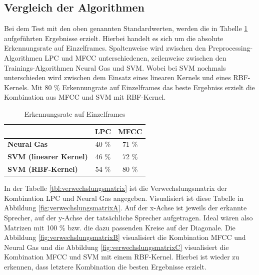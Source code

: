 \subsection{Vergleich der Algorithmen}
Bei dem Test mit den oben genannten Standardwerten, werden die in Tabelle \ref{tbl:vergleich} aufgeführten Ergebnisse erzielt. Hierbei handelt es sich um die absolute Erkennungsrate auf Einzelframes. Spaltenweise wird zwischen den Preprocessing-Algorithmen LPC und MFCC unterschiedenen, zeilenweise zwischen den Trainings-Algorithmen Neural Gas und SVM. Wobei bei SVM nochmals unterschieden wird zwischen dem Einsatz eines linearen Kernels und eines RBF-Kernels. Mit 80 \% Erkennungrate auf Einzelframes das beste Ergebniss erzielt die Kombination aus MFCC und SVM mit RBF-Kernel.

\begin{table}[h]
	\centering
	\begin{tabular}{l|c|c}			
		& \textbf{LPC} & \textbf{MFCC} \\
		\hline
		\textbf{Neural Gas} & 40 \% & 71 \% \\
		\textbf{SVM (linearer Kernel)} & 46 \% & 72 \% \\
		\textbf{SVM (RBF-Kernel)} & 54 \% & 80 \% \\
	\end{tabular}
	\caption{Erkennungsrate auf Einzelframes}
	\label{tbl:vergleich}
\end{table}

In der Tabelle \ref{tbl:verwechslungsmatrix} ist die Verwechslungsmatrix der Kombination LPC und Neural Gas angegeben. Visualisiert ist diese Tabelle in Abbildung \ref{fig:verwechslungsmatrixA}. Auf der x-Achse ist jeweils der erkannte Sprecher, auf der y-Achse der tatsächliche Sprecher aufgetragen. Ideal wären also Matrizen mit 100 \% bzw. die dazu passenden Kreise auf der Diagonale. Die Abbildung \ref{fig:verwechslungsmatrixB} visualisiert die Kombination MFCC und Neural Gas und die Abbildung \ref{fig:verwechslungsmatrixC} visualisiert die Kombination MFCC und SVM mit einem RBF-Kernel. Hierbei ist wieder zu erkennen, dass letztere Kombination die besten Ergebnisse erzielt.

\setlength{\tabcolsep}{6pt} %
\renewcommand{\arraystretch}{1.1} %

